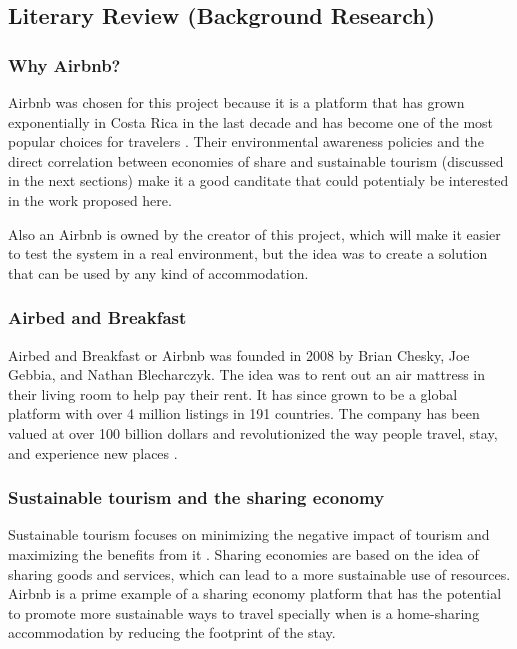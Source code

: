\documentclass[12pt]{extarticle}
\begin{document}
\subsection{Literary Review (Background Research)}

\subsubsection{Why Airbnb?}

Airbnb was chosen for this project because it is a platform that has grown exponentially in Costa Rica in the last decade and has become one of the most popular choices for travelers 
\cite{Neale2024}. Their environmental awareness policies and the direct correlation between economies of share and sustainable tourism (discussed in the next sections) make it a good canditate
that could potentialy be interested in the work proposed here. 

Also an Airbnb is owned by the creator of this project, which will make it easier to test the system in a real environment, 
but the idea was to create a solution that can be used by any kind  of accommodation.

\subsubsection{Airbed and Breakfast}

Airbed and Breakfast or Airbnb was founded in 2008 by Brian Chesky, Joe Gebbia, and Nathan Blecharczyk. The idea was to rent out an air mattress in their living room to help pay their 
rent. It has since grown to be a global platform with over 4 million listings in 191 countries. The company has been valued at over 100 billion dollars and 
revolutionized the way people travel, stay, and experience new places \cite{Satya2023}.

\subsubsection{Sustainable tourism and the sharing economy}

Sustainable tourism focuses on minimizing the negative impact of tourism and maximizing the benefits from it \cite{Webb2014}. Sharing economies are based on the idea of sharing goods
and services, which can lead to a more sustainable use of resources. Airbnb is a prime example of a sharing economy platform that has the potential to promote more sustainable ways to travel
specially when is a home-sharing accommodation \cite{Webb2014} by reducing the footprint of the stay.
\end{document}
